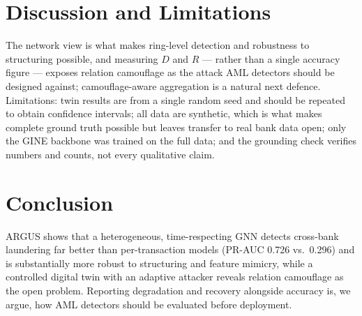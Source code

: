 \documentclass[conference]{IEEEtran}
\begin{document}
\section{Discussion and Limitations}
The network view is what makes ring-level detection and robustness to structuring possible, and measuring $D$ and $R$ --- rather than a single accuracy figure --- exposes relation camouflage as the attack AML detectors should be designed against; camouflage-aware aggregation \cite{dou2020enhancing} is a natural next defence. Limitations: twin results are from a single random seed and should be repeated to obtain confidence intervals; all data are synthetic, which is what makes complete ground truth possible but leaves transfer to real bank data open; only the GINE backbone was trained on the full data; and the grounding check verifies numbers and counts, not every qualitative claim.

\section{Conclusion}
ARGUS shows that a heterogeneous, time-respecting GNN detects cross-bank laundering far better than per-transaction models (PR-AUC 0.726 vs.\ 0.296) and is substantially more robust to structuring and feature mimicry, while a controlled digital twin with an adaptive attacker reveals relation camouflage as the open problem. Reporting degradation and recovery alongside accuracy is, we argue, how AML detectors should be evaluated before deployment.



\end{document}
